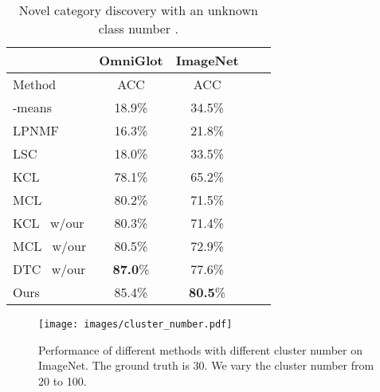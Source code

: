 \begin{table}[ht]
\footnotesize
\centering
\caption{Novel category discovery with an unknown class number .}\label{tab:comparison_unknown}
\begin{tabular}{lcccc}
 \toprule
    & OmniGlot
    & ImageNet \\
\midrule
Method & ACC  & ACC  \\
\midrule
-means~\cite{MackQueen67_Kmeans} & 18.9\% & 34.5\%\\
LPNMF~\cite{Cai09_LPNMF}  & 16.3\%  & 21.8\%\\
LSC~\cite{Chen11_LSC}  & 18.0\% & 33.5\% \\
\midrule
KCL~\cite{Hsu18_L2C} & 78.1\% & 65.2\% \\
MCL~\cite{Hsu19_MCL} & 80.2\% & 71.5\% \\
\midrule
KCL~\cite{Hsu18_L2C} w/our                & 80.3\%          & 71.4\%  \\
MCL~\cite{Hsu19_MCL} w/our                & 80.5\%          & 72.9\%  \\
DTC~\cite{han2019learning} w/our         & \textbf{87.0}\%          & 77.6\% \\
\midrule
Ours           & 85.4\% & \textbf{80.5}\% \\
\bottomrule
\end{tabular}
\end{table}

\begin{figure}
  \centering
  \texttt{[image: images/cluster\_number.pdf]}
  \caption{Performance of different methods with different cluster number on ImageNet. The ground truth is 30. We vary the cluster number from 20 to 100.}
  \label{fig:cluster_number}
\end{figure}


